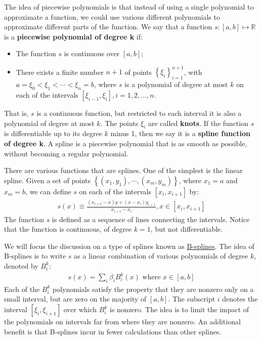 \documentclass[12pt, a4paper]{article}
\newcommand{\Set}[1]{\left\{#1\right\}}
\begin{document}
The idea of piecewise polynomials is that instead of using a single polynomial to approximate a function, we could use various different polynomials to approximate different parts of the function.
We say that a function \(s:[a,b]\mapsto\mathbb{R}\) is a \textbf{piecewise polynomial of degree k} if:
\begin{itemize}
\item The function \(s\) is continuous over \([a,b]\);
\item There exists a finite number \(n+1\) of points \(\Set{\xi_i}_{i=1}^{n+1}\), with \(a=\xi_0<\xi_1<\cdots<\xi_n=b\), where \(s\) is a polynomial of degree at most \(k\) on each of the intervals \([\xi_{i-1}, \xi_i], i=1,2,\ldots,n\).
\end{itemize}
That is, \(s\) is a continuous function, but restricted to each interval it is also a polynomial of degree at most \(k\).
The points \(\xi_i\) are called \textbf{knots}.
If the function \(s\) is differentiable up to its degree \(k\) minus 1, then we say it is a \textbf{spline function of degree k}.
A spline is a piecewise polynomial that is as smooth as possible, without becoming a regular polynomial.

There are various functions that are splines.
One of the simplest is the linear spline.
Given a set of points \(\Set{(x_1, y_1), \cdots, (x_m, y_m)}\), where \(x_1=a\) and \(x_m=b\), we can define \(s\) on each of the intervals \([x_i, x_{i+1}]\) by:
\begin{align*}
s(x)\equiv\frac{(x_{i+1}-x)y+(x-x_i)y_{i+1}}{x_{i+1}-x_i},  x\in[x_i,x_{i+1}]
\end{align*}
The function \(s\) is defined as a sequence of lines connecting the intervals.
Notice that the function is continuous, of degree \(k=1\), but not differentiable.

We will focus the discussion on a type of splines known as \href{https://en.wikipedia.org/wiki/B-spline}{B-splines}.
The idea of B-splines is to write \(s\) as a linear combination of various polynomials of degree \(k\), denoted by \(B_i^k\):
\begin{align*}
s(x)=\sum_{i}\beta_iB_i^k(x) \text{ where } x\in[a, b]
\end{align*}
Each of the \(B_i^k\) polynomials satisfy the property that they are nonzero only on a small interval, but are zero on the majority of \([a, b]\).
The subscript \(i\) denotes the interval \([\xi_{i}, \xi_{i+1}]\) over which \(B_i^k\) is nonzero.
The idea is to limit the impact of the polynomials on intervals far from where they are nonzero.
An additional benefit is that B-splines incur in fewer calculations than other splines.
\end{document}
